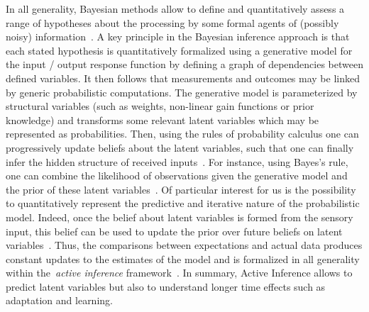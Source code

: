 \documentclass[12pt,english]{article}%
\newcommand{\citep}[1]{\parencite{#1}}
\begin{document}
In all generality, Bayesian methods allow to define and quantitatively assess
a range of hypotheses about the processing by some formal agents
of (possibly noisy) information~\citep{Deneve1999, Diaconescu2014, Daunizeau10a}.
A key principle in the Bayesian inference approach is
that each stated hypothesis is quantitatively formalized
using a generative model for the input / output response function
by defining a graph of dependencies between defined variables.
It then follows that measurements and outcomes may be linked by
generic probabilistic computations.
The generative model is parameterized by structural variables
(such as weights, non-linear gain functions or prior knowledge)
and transforms some relevant latent variables
which may be represented as probabilities.
Then, using the rules of probability calculus
one can progressively update beliefs about the latent variables,
such that one can finally infer the hidden structure of received inputs~\citep{Hoyer2003, Ma2014}.
For instance, using Bayes's rule, one can combine
the likelihood of observations given the generative model and
the prior of these latent variables~\citep{Janes2014}.
Of particular interest for us is the possibility to
quantitatively represent
the predictive and iterative nature of the probabilistic model.
Indeed, once the belief about latent variables
is formed from the sensory input,
this belief can be used to update
the prior over future beliefs on latent variables~\citep{Montagnini2007}.
Thus, the comparisons between expectations and actual data produces
constant updates to the estimates of the model and
is formalized in all generality within the~\textit{active inference} framework~\citep{Friston2003, Friston2010}.
In summary, Active Inference allows to predict latent variables
but also to understand longer time effects such as adaptation and learning.
\end{document}
